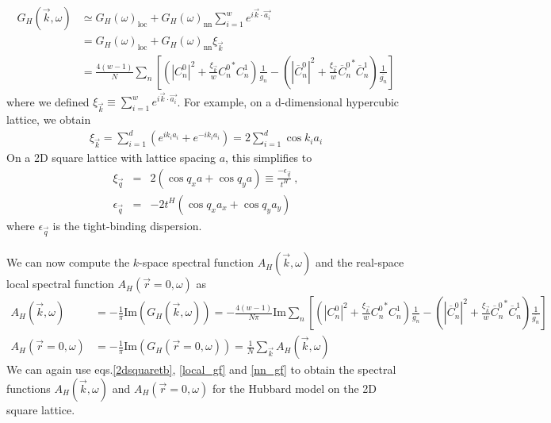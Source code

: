 \documentclass{report}
\numberwithin{equation}{section}
\begin{document}
\begin{equation}\begin{aligned}
	\label{k_Gf}
	G_H (\vec k, \omega) &\simeq G_H (\omega)_\text{loc} + G_H (\omega)_\text{nn}\sum_{i=1}^w e^{i \vec{k}\cdot\vec {a_i}}\\
			     &= G_H (\omega)_\text{loc} + G_H (\omega)_\text{nn} \xi_{\vec k}\\
			     &= \frac{4(w-1)}{N}\sum_n\left[\left(|C^0_{n}|^2 + \frac{\xi_{\vec{k}}}{w}{C^0_{n}}^* C^1_{n} \right)\frac{1}{g_n} - \left(|\overline C^0_{n}|^2 + \frac{\xi_{\vec{k}}}{w}{\overline C^0_{n}}^* \overline C^1_{n}\right)\frac{1}{\overline{g_n}}\right]
\end{aligned}\end{equation}
where we defined \(\xi_{\vec k} \equiv \sum_{i=1}^w e^{i \vec{k}\cdot\vec {a_i}}\). For example, on a d-dimensional hypercubic lattice, we obtain
\begin{equation}\begin{aligned}
	\xi_{\vec k} = \sum_{i=1}^d \left(e^{i k_i {a_i}} + e^{-i k_i {a_i}}\right) = 2\sum_{i=1}^d \cos k_i a_i
\end{aligned}\end{equation}
On a 2D square lattice with lattice spacing $a$, this simplifies to
\begin{eqnarray}
\xi_{\vec{q}} &=& 2(\cos q_{x}a + \cos q_{y}a)\equiv \frac{-\epsilon_{\vec{q}}}{t^{H}}~,\nonumber\\
\epsilon_{\vec{q}} &=& -2t^{H}(\cos q_{x}a_{x} + \cos q_{y}a_{y})~
\end{eqnarray}
where \(\epsilon_{\vec{q}}\) is the tight-binding dispersion.
\\\\
We can now compute the $k$-space spectral function $A_{H}(\vec{k},\omega)$ and the real-space local spectral function $A_{H}(\vec{r}=0,\omega)$ as
\begin{equation}\begin{aligned}
	A_{H}(\vec{k},\omega) &= -\frac{1}{\pi} \textrm{Im}(G_{H}(\vec{k},\omega)) = -\frac{4(w-1)}{N\pi} \textrm{Im}\sum_n\left[\left(|C^0_{n}|^2 + \frac{\xi_{\vec{k}}}{w}{C^0_{n}}^* C^1_{n} \right)\frac{1}{g_n} - \left(|\overline C^0_{n}|^2 + \frac{\xi_{\vec{k}}}{w}{\overline C^0_{n}}^* \overline C^1_{n}\right)\frac{1}{\overline{g_n}}\right]\\
A_{H}(\vec{r}=0,\omega) &= -\frac{1}{\pi} \textrm{Im}(G_{H}(\vec{r}=0,\omega)) = \frac{1}{N}\sum_{\vec{k}}A_{H}(\vec{k},\omega)
\end{aligned}\end{equation}
We can again use eqs.\eqref{2dsquaretb}, \eqref{local_gf} and \eqref{nn_gf} to obtain the spectral functions  $A_{H} (\vec{k},\omega)$ and $A_{H} (\vec{r}=0,\omega)$ for the Hubbard model on the 2D square lattice.
\end{document}
